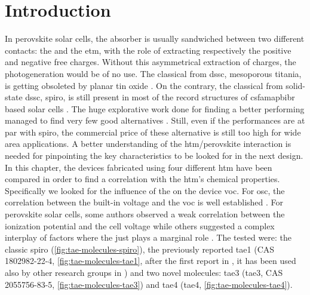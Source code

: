 


\section{Introduction}
	In perovskite solar cells, the absorber is usually sandwiched between two different contacts: the  and the \gls{etm}, with the role of extracting respectively the positive and negative free charges.
	Without this asymmetrical extraction of charges, the photogeneration would be of no use.
	The classical  from \gls{dssc}, mesoporous titania, is getting obsoleted by planar tin oxide \cite{Jiang2018}.
	On the contrary, the classical  from solid-state \gls{dssc}, \gls{spiro}, is still present in most of the record structures of \gls{csfamapbibr} based solar cells \cite{Saliba2016,Saliba2018}.
	The huge explorative work done for finding a better performing  managed to find very few good alternatives \cite{Rodriguez-Seco2018}.
	Still, even if the performances are at par with \gls{spiro}, the commercial price of these alternative  is still too high for wide area applications.
	A better understanding of the \gls{htm}\-/perovskite interaction is needed for pinpointing the key characteristics to be looked for in the next  design.
	In this chapter, the devices fabricated using four different \gls{htm} have been compared in order to find a correlation with the \gls{htm}'s chemical properties.
	Specifically we looked for the influence of the  on the device \gls{voc}.
	For \gls{osc}, the correlation between the built-in voltage and the \gls{voc} is well established \cite{Kooistra2007,Gadisa2004,Brabec2001,Wilke2012,Chen2009,Tress2011,Sanchez-Diaz2010}.
	For perovskite solar cells, some authors observed a weak correlation between the  ionization potential and the cell voltage \cite{Polander2014,Abate2015a,Kwon2014,Rakstys2015,Wu2016a} while others suggested a complex interplay of factors where the   just plays a marginal role \cite{Correa-Baena2017,Belisle2016,Ishida2016,Park2018,Jimenez-Lopez2017,Tress2017}.
	The tested  were: the classic \gls{spiro} (\cref{fig:tae-molecules-spiro}), the previously reported \gls{tae1} (CAS 1802982-22-4, \cref{fig:tae-molecules-tae1}, after the first report in \cite{Cabau2015a}, it has been used also by other research groups in \cite{Choi2015b,Labban2016,Wu2016a,Wu2016b}) and two novel molecules: \glsdesc{tae3} (\gls{tae3}, CAS 2055756-83-5, \cref{fig:tae-molecules-tae3}) and \glsdesc{tae4} (\gls{tae4}, \cref{fig:tae-molecules-tae4}).

